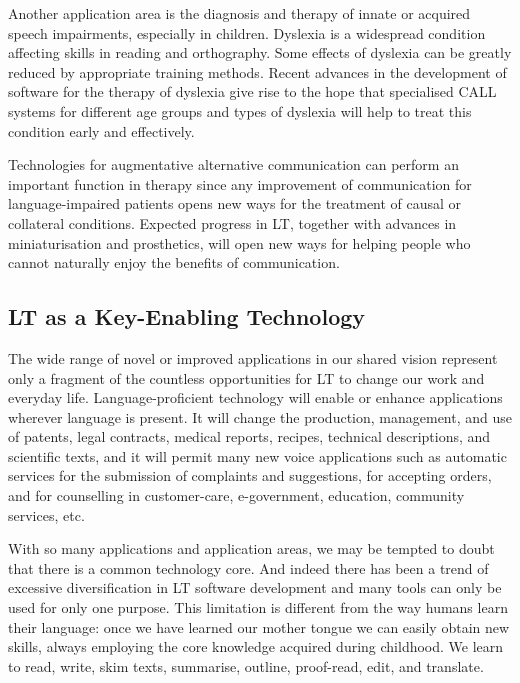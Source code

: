 \documentclass[10pt, plain]{../../metanetpaper}
\begin{document}
\begin{multicols}{2}
Another application area is the diagnosis and therapy of innate or acquired speech impairments, especially in children. Dyslexia is a widespread condition affecting skills in reading and orthography. Some effects of dyslexia can be greatly reduced by appropriate training methods. Recent advances in the development of software for the therapy of dyslexia give rise to the hope that specialised CALL systems for different age groups and types of dyslexia will help to treat this condition early and effectively.
 
Technologies for augmentative alternative communication can perform an important function in therapy since any improvement of communication for language-impaired patients opens new ways for the treatment of causal or collateral conditions. Expected progress in LT, together with advances in miniaturisation and prosthetics, will open new ways for helping people who cannot naturally enjoy the benefits of communication.

\subsection[Language Technology as a Key-Enabling Technology]{LT as a Key-Enabling Technology}
\label{sec:lang-techn-as-key-enabling-technology}

The wide range of novel or improved applications in our shared vision represent only a fragment of the countless opportunities for LT to change our work and everyday life. Language-proficient technology will enable or enhance applications wherever language is present. It will change the production, management, and use of patents, legal contracts, medical reports, recipes, technical descriptions, and scientific texts, and it will permit many new voice applications such as automatic services for the submission of complaints and suggestions, for accepting orders, and for counselling in customer-care, e-government, education, community services, etc.   

With so many applications and application areas, we may be tempted to doubt that there is a common technology core. And indeed there has been a trend of excessive diversification in LT software development and many tools can only be used for only one purpose. This limitation is different from the way humans learn their language: once we have learned our mother tongue we can easily obtain new skills, always employing the core knowledge acquired during childhood. We learn to read, write, skim texts, summarise, outline, proof-read, edit, and translate.
 

\end{multicols}
\end{document}
